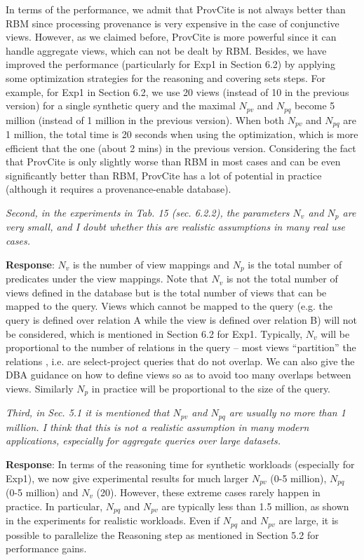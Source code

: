 \begin{appendix}
In terms of the performance, we admit that ProvCite is not always better than RBM since processing provenance is very expensive in the case of conjunctive views. However, as we claimed before, ProvCite is more powerful since it can handle aggregate views, which can not be dealt by RBM. Besides, we have improved the performance (particularly for Exp1 in Section 6.2) by applying some optimization strategies for the reasoning and covering sets steps. For example, for Exp1 in Section 6.2, we use 20 views (instead of 10 in the previous version) for a single synthetic query and the maximal $N_{pv}$ and $N_{pq}$ become 5 million (instead of 1 million in the previous version). When both  $N_{pv}$ and $N_{pq}$ are 1 million, the total time is 20 seconds when using the optimization, which is more efficient that the one (about 2 mins) in the previous version.   Considering the fact that ProvCite is only slightly worse than RBM in most cases and can be even significantly better than RBM, ProvCite has a lot of potential in practice (although it requires a provenance-enable database).


\textit{Second, in the experiments in Tab. 15 (sec. 6.2.2), the parameters $N_v$ and $N_p$ are very small, and I doubt whether this are realistic assumptions in many real use cases. }

\textbf{Response}: $N_v$ is the number of view mappings and $N_p$ is the total number of predicates under the view mappings.  Note that $N_v$ is not the total number of views defined in the database but is the total number of views that can be mapped to the query. Views which cannot be mapped to the query (e.g. the query is defined over relation A while the view is defined over relation B) will not be considered, which is mentioned in Section 6.2 for Exp1.  Typically, $N_v$ will be proportional to the number of relations in the query -- most views ``partition'' the relations \cite{wu2018data}, i.e. are select-project queries that do not overlap.   We can also give the DBA guidance on how to define views so as to avoid too many overlaps between views. Similarly $N_p$ in practice will be proportional to the size of the query.  


\textit{Third, in Sec. 5.1 it is mentioned that $N_{pv}$ and $N_{pq}$ are usually no more than 1 million. I think that this is not a realistic assumption in many modern applications, especially for aggregate queries over large datasets.}

\textbf{Response}: In terms of the reasoning time for synthetic workloads (especially for Exp1), we now give experimental results for much larger $N_{pv}$ (0-5 million), $N_{pq}$ (0-5 million) and $N_v$ (20). However, these extreme cases rarely happen in practice.  In particular, $N_{pq}$ and $N_{pv}$ are typically less than 1.5 million,  as shown in the experiments for realistic workloads. Even if $N_{pq}$ and $N_{pv}$ are large, it is possible to parallelize the Reasoning step as mentioned in Section 5.2 for performance gains.


\end{appendix}
